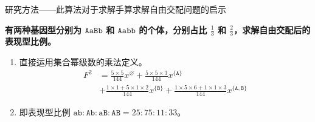 \documentclass[10pt,aspectratio=43,mathserif]{ctexbeamer}
\begin{document}
	\begin{frame}{研究方法——此算法对于求解手算求解自由交配问题的启示}
		
		\textbf{有两种基因型分别为 $\texttt{AaBb}$ 和 $\texttt{Aabb}$ 的个体，分别占比 $\frac{1}{3}$ 和 $\frac{2}{3}$，求解自由交配后的表现型比例。}
		
		\begin{enumerate}
			\item 直接运用集合幂级数的乘法定义。\\
			$$
			\begin{aligned}
				F^2 &= \frac{5 \times 5}{144} x^{\varnothing} + \frac{5 \times 5 \times 3}{144} x^{\{\texttt{A}\}} \\ &+ \frac{1 \times 1 + 5 \times 1 \times 2}{144} x^{\{\texttt{B}\}} + \frac{1 \times 5 \times 6 + 1 \times 1 \times 3}{144} x^{\{\texttt{A},\texttt{B}\}}
			\end{aligned}
			$$
			\item 即表现型比例 $\texttt{ab} : \texttt{Ab} : \texttt{aB} : \texttt{AB}=25:75:11:33$。
		\end{enumerate}
	\end{frame}
\end{document}
